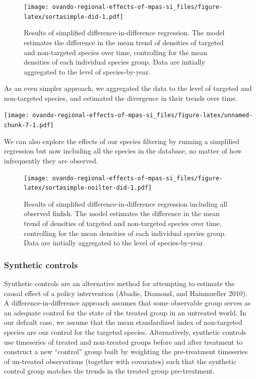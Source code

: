 \documentclass[]{article}
\begin{document}
\begin{figure}
\centering
\texttt{[image: ovando-regional-effects-of-mpas-si\_files/figure-latex/sortasimple-did-1.pdf]}
\caption{\label{fig:sortasimple-did}Results of simplified difference-in-difference regression. The model estimates the difference in the mean trend of densities of targeted and non-targeted species over time, controlling for the mean densities of each individual species group. Data are initially aggregated to the level of species-by-year.}
\end{figure}

As an even simpler approach, we aggregated the data to the level of targeted and non-targeted species, and estimated the divergence in their trends over time.

\texttt{[image: ovando-regional-effects-of-mpas-si\_files/figure-latex/unnamed-chunk-7-1.pdf]}

We can also explore the effects of our species filtering by running a simplified regression but now including all the species in the database, no matter of how infrequently they are observed.

\begin{figure}
\centering
\texttt{[image: ovando-regional-effects-of-mpas-si\_files/figure-latex/sortasimple-noilter-did-1.pdf]}
\caption{\label{fig:sortasimple-noilter-did}Results of simplified difference-in-difference regression including all observed finfish. The model estimates the difference in the mean trend of densities of targeted and non-targeted species over time, controlling for the mean densities of each individual species group. Data are initially aggregated to the level of species-by-year.}
\end{figure}

\hypertarget{synthetic-controls}{%
\subsubsection{Synthetic controls}\label{synthetic-controls}}

Synthetic controls are an alternative method for attempting to estimate the causal effect of a policy intervention (Abadie, Diamond, and Hainmueller 2010). A difference-in-difference approach assumes that some observable group serves as an adequate control for the state of the treated group in an untreated world. In our default case, we assume that the mean standardized index of non-targeted species are our control for the targeted species. Alternatively, synthetic controls use timeseries of treated and non-treated groups before and after treatment to construct a new ``control'' group built by weighting the pre-treatment timeseries of un-treated observations (together with covariates) such that the synthetic control group matches the trends in the treated group pre-treatment.
\end{document}
